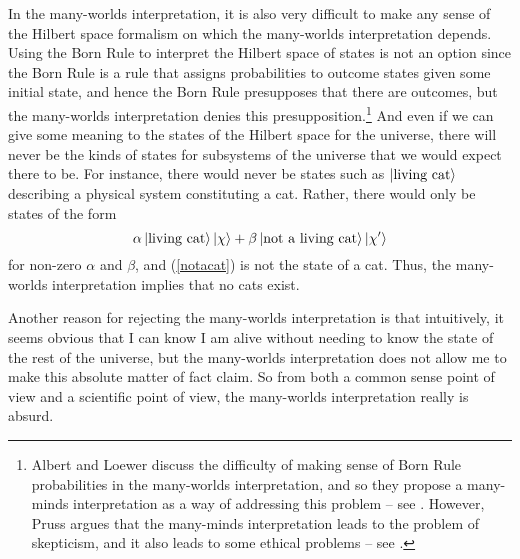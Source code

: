       In the many-worlds interpretation, it is also very difficult to make any sense of the Hilbert space formalism on which the many-worlds interpretation depends. Using the Born Rule to interpret the Hilbert space of states is not an option since the Born Rule is a rule that assigns probabilities to outcome states given some initial state, and hence the Born Rule presupposes that there are outcomes, but the many-worlds interpretation denies this presupposition.\footnote{Albert and Loewer discuss the difficulty of making sense of Born Rule probabilities in the many-worlds interpretation, and so they propose a many-minds interpretation as a way of addressing this problem -- see \cite{AlbertDavid1988ItMW}. However, Pruss argues that 
      the many-minds interpretation leads to the problem of skepticism, and it also leads to some ethical problems -- see \cite[106--109]{PrussAlexanderR.2018ATFI}.} And even if we can give some meaning to the states of the Hilbert space for the universe, there will never be the kinds of states for subsystems of the universe that we would expect there to be. For instance, there would never be states such as $\ket{\text{living cat}}$ describing a physical system constituting a cat. Rather, there would only be states of the form 
      \begin{equation}\label{notacat}
      \alpha\ket{\text{living cat}}\ket{\chi}+\beta\ket{\text{not a living cat}}\ket{\chi'}
    \end{equation} for non-zero $\alpha$ and $\beta$, and (\ref{notacat}) is not the state of a cat. Thus, the many-worlds interpretation implies that 
    no cats exist.

      
      Another reason for rejecting the many-worlds interpretation is that intuitively, it seems obvious that I can know I am alive without needing to know the state of the rest of the universe, but the many-worlds interpretation does not allow me to make this absolute matter of fact claim. 
       So from both a common sense point of view and a scientific point of view, the many-worlds interpretation really is absurd.
       
